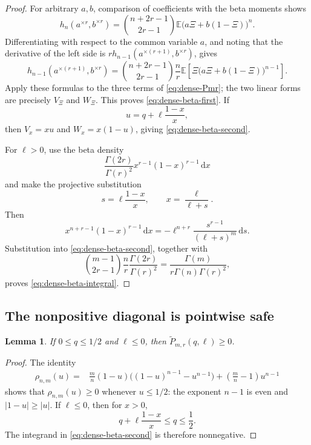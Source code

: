 \documentclass[11pt]{article}
\newtheorem{lemma}[theorem]{Lemma}
\newcommand{\dd}{\,\mathrm d}
\newcommand{\E}{\mathbb E}
\begin{document}
\begin{proof}
For arbitrary \(a,b\), comparison of coefficients with the beta moments
shows
\begin{equation}\label{eq:dense-beta-h}
 h_n(a^{\times r},b^{\times r})
 =\binom{n+2r-1}{2r-1}
  \E\bigl(a\Xi+b(1-\Xi)\bigr)^n.
\end{equation}
Differentiating with respect to the common variable \(a\), and noting that
the derivative of the left side is
\(r h_{n-1}(a^{\times(r+1)},b^{\times r})\), gives
\begin{equation}\label{eq:dense-beta-h-deriv}
 h_{n-1}(a^{\times(r+1)},b^{\times r})
 =\binom{n+2r-1}{2r-1}\frac nr
  \E\left[\Xi\bigl(a\Xi+b(1-\Xi)\bigr)^{n-1}\right].
\end{equation}
Apply these formulas to the three terms of \eqref{eq:dense-Pmr}; the two
linear forms are precisely \(V_\Xi\) and \(W_\Xi\).  This proves
\eqref{eq:dense-beta-first}.  If
\[
       u=q+\ell\frac{1-x}{x},
\]
then \(V_x=xu\) and \(W_x=x(1-u)\), giving
\eqref{eq:dense-beta-second}.

For \(\ell>0\), use the beta density
\[
       \frac{\Gamma(2r)}{\Gamma(r)^2}
       x^{r-1}(1-x)^{r-1}\dd x
\]
and make the projective substitution
\[
       s=\ell\frac{1-x}{x},
       \qquad x=\frac\ell{\ell+s}.
\]
Then
\[
 x^{n+r-1}(1-x)^{r-1}\dd x
 =-\ell^{n+r}\frac{s^{r-1}}{(\ell+s)^m}\dd s.
\]
Substitution into \eqref{eq:dense-beta-second}, together with
\[
 \binom{m-1}{2r-1}\frac nr
 \frac{\Gamma(2r)}{\Gamma(r)^2}
 =\frac{\Gamma(m)}{r\Gamma(n)\Gamma(r)^2},
\]
proves \eqref{eq:dense-beta-integral}.
\end{proof}

\subsection{The nonpositive diagonal is pointwise safe}

\begin{lemma}\label{lem:dense-ell-negative}
If \(0\le q\le1/2\) and \(\ell\le0\), then
\(\widetilde P_{m,r}(q,\ell)\ge0\).
\end{lemma}

\begin{proof}
The identity
\begin{align}
 \rho_{n,m}(u)
 ={}&\frac mn(1-u)
       \bigl((1-u)^{n-1}-u^{n-1}\bigr)
    +\left(\frac mn-1\right)u^{n-1}
 \label{eq:dense-rho-pointwise}
\end{align}
shows that \(\rho_{n,m}(u)\ge0\) whenever \(u\le1/2\): the exponent
\(n-1\) is even and \(|1-u|\ge|u|\).  If \(\ell\le0\), then for
\(x>0\),
\[
       q+\ell\frac{1-x}{x}\le q\le\frac12.
\]
The integrand in \eqref{eq:dense-beta-second} is therefore nonnegative.
\end{proof}
\end{document}
